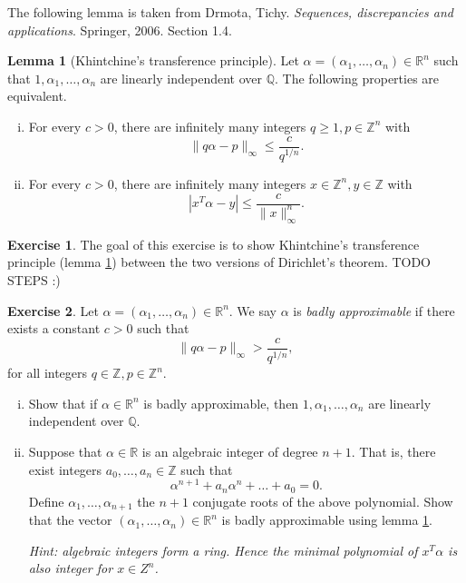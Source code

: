 \documentclass[12pt,a4paper]{article}
\theoremstyle{plain}
\newtheorem*{Sol*}{Solution}
\theoremstyle{definition}
\newtheorem{Ex}{Exercise}
\newtheorem{lemma}[theorem]{Lemma}
\def \Q {\mathbb Q}
\def \R {\mathbb R}
\def \Z {\mathbb Z}
\newif\ifsolutions
\newcommand{\exercise}[2]{
			\begin{Ex} #1 \end{Ex}
			\ifsolutions  \begin{Sol*} #2 \end{Sol*} \bigskip \else \bigskip  \fi
		}
\begin{document}
The following lemma is taken from Drmota, Tichy.  \emph{Sequences, discrepancies and applications}. Springer, 2006. Section 1.4.
\begin{lemma}[Khintchine's transference principle]\label{lem:1}
	Let $\alpha = (\alpha_1, \dots, \alpha_n) \in \R^n$ such that $1, \alpha_1, \dots, \alpha_n$ are linearly independent over $\Q$.
	The following properties are equivalent.
	\begin{enumerate}[i)]
		\item For every $c > 0$, there are infinitely many integers $q \geq 1, p \in \Z^n$ with
			\[ \| q \alpha - p \|_\infty \leq \frac{c}{q^{1/n}}. \]
		\item For every $c > 0$, there are infinitely many integers $x \in \Z^n, y \in \Z$ with
			\[ | x^T \alpha - y | \leq \frac{c}{ \| x \|_\infty^n}. \]
	\end{enumerate}
\end{lemma}

\exercise{
	The goal of this exercise is to show Khintchine's transference principle (lemma \ref{lem:1}) between the two versions of Dirichlet's theorem.
	TODO STEPS :)
}
{}

\exercise{
	Let $\alpha = (\alpha_1, \dots, \alpha_n) \in \R^n$. We say $\alpha$ is \emph{badly approximable} if there exists a constant $c > 0$ such that
		\[ \| q \alpha - p \|_\infty > \frac{c}{q^{1/n}}, \]
	for all integers $q \in \Z, p \in \Z^n$.

	\begin{enumerate}[i)]
		\item Show that if $\alpha \in \R^n$ is badly approximable, then $1, \alpha_1, \dots, \alpha_n$ are linearly independent over $\Q$.
		\item Suppose that $\alpha \in \R$ is an algebraic integer of degree $n+1$. That is, there exist integers $a_0, \dots, a_{n} \in \Z$ such that
			\[ \alpha^{n+1} + a_{n} \alpha^{n} + \dots +  a_{0} = 0. \]
		Define $\alpha_1, \dots, \alpha_{n+1}$ the $n+1$ conjugate roots of the above polynomial.
		Show that the vector $(\alpha_1, \dots, \alpha_n) \in \R^n$ is badly approximable using lemma \ref{lem:1}.

		\emph{Hint: algebraic integers form a ring. Hence the minimal polynomial of $x^T \alpha$ is also integer for $x \in Z^n$.}
	\end{enumerate}
}
{}
\end{document}
